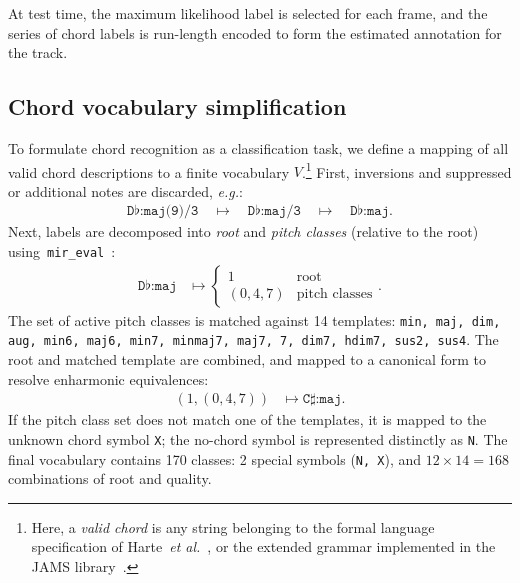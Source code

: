 \documentclass{article}
\def\eg{\emph{e.g.}}
\begin{document}
At test time, the maximum likelihood label is selected for each frame, and the series of chord labels is run-length encoded to form the estimated annotation for the track.


\subsection{Chord vocabulary simplification}

\label{sec:vocab}
%

To formulate chord recognition as a classification task, we define a mapping of all valid chord descriptions to a finite vocabulary $V$.\footnote{Here, a \emph{valid chord} is any string belonging to the formal language specification of Harte~\emph{et al.}~\cite{harte2005symbolic}, or the extended grammar implemented in the JAMS library~\cite{humphrey2014jams}.}
First, inversions and suppressed or additional notes are discarded, \eg:
\begin{align*}
    \texttt{D}\flat\texttt{:maj(9)/3} 
    \quad\mapsto\quad \texttt{D}\flat\texttt{:maj/3}
    \quad\mapsto\quad \texttt{D}\flat\texttt{:maj}.
\end{align*}
Next, labels are decomposed into \emph{root} and \emph{pitch classes} (relative to the root) using~\texttt{mir\_eval}~\cite{raffel2014mir_eval}:
\begin{align*}
    \texttt{D}\flat\texttt{:maj} &\mapsto \begin{cases}
        1 & \text{root}\\
        (0, 4, 7) & \text{pitch classes}
    \end{cases}.
\end{align*}
The set of active pitch classes is matched against 14 templates: \texttt{min, maj, dim, aug, min6, maj6, min7, minmaj7, maj7, 7, dim7, hdim7, sus2, sus4}.
The root and matched template are combined, and mapped to a canonical form to resolve enharmonic equivalences:
\begin{align*}
    \left(1, (0, 4, 7) \right) &\mapsto \texttt{C}\sharp\texttt{:maj}.
\end{align*}
If the pitch class set does not match one of the templates, it is mapped to the unknown chord symbol \texttt{X}; the no-chord symbol is represented distinctly as \texttt{N}.
The final vocabulary contains 170 classes: 2 special symbols (\texttt{N, X}), and $12\times14=168$ combinations of root and quality.
\end{document}
